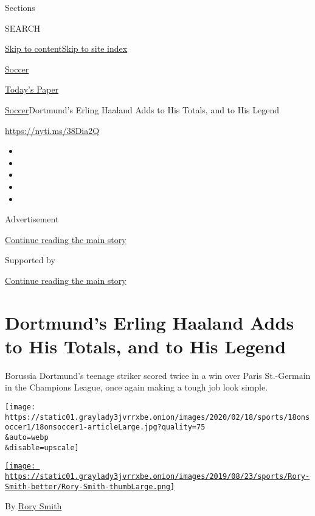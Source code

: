Sections

SEARCH

\protect\hyperlink{site-content}{Skip to
content}\protect\hyperlink{site-index}{Skip to site index}

\href{https://www.nytimes3xbfgragh.onion/section/sports/soccer}{Soccer}

\href{https://myaccount.nytimes3xbfgragh.onion/auth/login?response_type=cookie\&client_id=vi}{}

\href{https://www.nytimes3xbfgragh.onion/section/todayspaper}{Today's
Paper}

\href{/section/sports/soccer}{Soccer}\textbar{}Dortmund's Erling Haaland
Adds to His Totals, and to His Legend

\url{https://nyti.ms/38Dia2Q}

\begin{itemize}
\item
\item
\item
\item
\item
\end{itemize}

Advertisement

\protect\hyperlink{after-top}{Continue reading the main story}

Supported by

\protect\hyperlink{after-sponsor}{Continue reading the main story}

\hypertarget{dortmunds-erling-haaland-adds-to-his-totals-and-to-his-legend}{%
\section{Dortmund's Erling Haaland Adds to His Totals, and to His
Legend}\label{dortmunds-erling-haaland-adds-to-his-totals-and-to-his-legend}}

Borussia Dortmund's teenage striker scored twice in a win over Paris
St.-Germain in the Champions League, once again making a tough job look
simple.

\texttt{[image: https://static01.graylady3jvrrxbe.onion/images/2020/02/18/sports/18onsoccer1/18onsoccer1-articleLarge.jpg?quality=75\\\&auto=webp\\\&disable=upscale]}

\href{https://www.nytimes3xbfgragh.onion/by/rory-smith}{\texttt{[image: https://static01.graylady3jvrrxbe.onion/images/2019/08/23/sports/Rory-Smith-better/Rory-Smith-thumbLarge.png]}}

By \href{https://www.nytimes3xbfgragh.onion/by/rory-smith}{Rory Smith}

